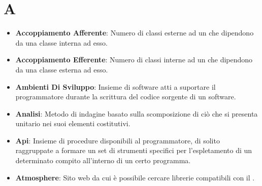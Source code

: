 \section{A}
\begin{itemize}
	\item
	\textbf{Accoppiamento Afferente}: Numero di classi esterne ad un  che dipendono da una classe interna ad esso.
	\item
	\textbf{Accoppiamento Efferente}: Numero di classi interne ad un  che dipendono da una classe esterna ad esso.
	\item
	\textbf{Ambienti Di Sviluppo}: Insieme di software atti a suportare il programmatore durante la scrittura del codice sorgente di un software.
	\item
	\textbf{Analisi}: Metodo di indagine basato sulla scomposizione di ciò che si presenta unitario nei suoi elementi costitutivi.
	\item
	\textbf{Api}: Insieme di procedure disponibili al programmatore, di solito raggruppate a formare un set di strumenti specifici per l'espletamento di un determinato compito all'interno di un certo programma.
	\item
	\textbf{Atmosphere}: Sito web da cui è possibile cercare librerie compatibili con il  .
\end{itemize}
\newpage